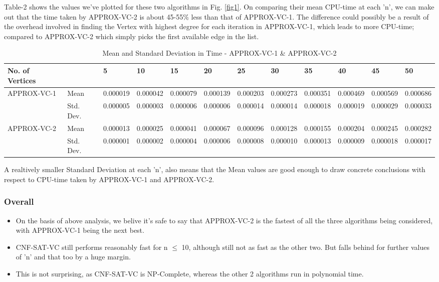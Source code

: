 \documentclass[11pt]{llncs}
\begin{document}
		Table-2 shows the values we've plotted for these two algorithms in Fig. \ref{fig1}. On comparing their mean CPU-time at each 'n', we can make out that the time taken by APPROX-VC-2 is about 45-55\% less than that of APPROX-VC-1. The difference could possibly be a result of the overhead involved in finding the Vertex with highest degree for each iteration in APPROX-VC-1, which leads to more CPU-time; compared to APPROX-VC-2 which simply picks the first available edge in the list.

		\vspace{-8mm}

		\begin{table}
			\caption{Mean and Standard Deviation in Time - APPROX-VC-1 \& APPROX-VC-2}\label{tab1}
			\begin{tabular}{|l|l|l|l|l|l|l|l|l|l|l|l|}
				\hline
				No. of Vertices &  & 5 & 10 & 15 & 20 & 25 & 30 & 35 & 40 & 45 & 50 \\

				\hline
				APPROX-VC-1 & Mean & 0.000019 & 0.000042 & 0.000079 & 0.000139 & 0.000203 & 0.000273 & 0.000351 & 0.000469 & 0.000569 & 0.000686 \\
				& Std. Dev.& 0.000005 & 0.000003 & 0.000006 & 0.000006 & 0.000014 & 0.000014 & 0.000018 & 0.000019 & 0.000029 & 0.000033 \\
				\hline
				APPROX-VC-2 & Mean & 0.000013 & 0.000025 & 0.000041 & 0.000067 & 0.000096 & 0.000128 & 0.000155 & 0.000204 & 0.000245 & 0.000282 \\
				& Std. Dev. & 0.000001 & 0.000002 & 0.000004 & 0.000006 & 0.000008 & 0.000010 & 0.000013 & 0.000009 & 0.000018 & 0.000017 \\
				\hline
			\end{tabular}
		\end{table}
		
		\vspace{-5mm}
		
		A realtively smaller Standard Deviation at each 'n', also means that the Mean values are good enough to draw concrete conclusions with respect to CPU-time taken by APPROX-VC-1 and APPROX-VC-2.
		
		
	\subsubsection{Overall}
		\vspace{-2mm}
		\begin{itemize}
			\item On the basis of above analysis, we belive it's safe to say that APPROX-VC-2 is the fastest of all the three algorithms being considered, with APPROX-VC-1 being the next best.
			\item CNF-SAT-VC still performs reasonably fast for n $\leq$ 10, although still not as fast as the other two. But falls behind for further values of 'n' and that too by a huge margin.
			\item This is not surprising, as CNF-SAT-VC is NP-Complete, whereas the other 2 algorithms run in polynomial time.
		\end{itemize}
\end{document}
